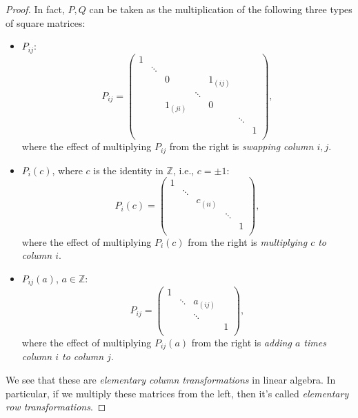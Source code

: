 \begin{proof}
	In fact, \(P, Q\) can be taken as the multiplication of the following three types of square matrices:
	\begin{itemize}
		\item \(P_{ij} \):
		      \[
			      P_{ij} = \begin{pmatrix}
				      1 &        &           &        &           &        &   \\
				        & \ddots &           &        &           &        &   \\
				        &        & 0         &        & 1_{(i j)} &        &   \\
				        &        &           & \ddots &           &        &   \\
				        &        & 1_{(j i)} &        & 0         &        &   \\
				        &        &           &        &           & \ddots &   \\
				        &        &           &        &           &        & 1 \\
			      \end{pmatrix},
		      \]
		      where the effect of multiplying \(P_{ij} \) from the right is \emph{swapping column \(i, j\)}.
		\item \(P_{i}(c) \), where \(c\) is the identity in \(\mathbb{Z} \), i.e., \(c = \pm 1\):
		      \[
			      P_{i}(c) = \begin{pmatrix}
				      1 &        &          &        &   \\
				        & \ddots &          &        &   \\
				        &        & c_{(ii)} &        &   \\
				        &        &          & \ddots &   \\
				        &        &          &        & 1 \\
			      \end{pmatrix},
		      \]
		      where the effect of multiplying \(P_{i}(c)\) from the right is \emph{multiplying \(c\) to column \(i\)}.
		\item \(P_{ij}(a) \), \(a\in \mathbb{Z} \):
		      \[
			      P_{ij} = \begin{pmatrix}
				      1 &        &           &   \\
				        & \ddots & a_{(i j)} &   \\
				        &        & \ddots    &   \\
				        &        &           & 1 \\
			      \end{pmatrix},
		      \]
		      where the effect of multiplying \(P_{ij}(a) \) from the right is \emph{adding \(a\) times column \(i\) to column \(j\)}.
	\end{itemize}
	We see that these are \emph{elementary column transformations} in linear algebra. In particular, if we multiply these matrices from the left, then it's called \emph{elementary row transformations}.


\end{proof}
